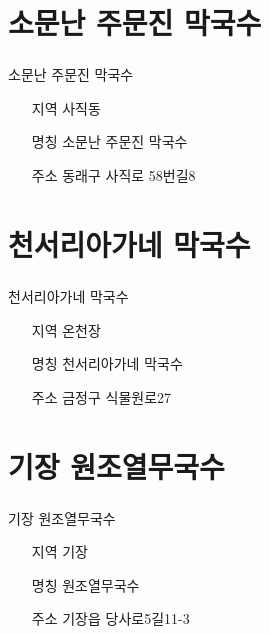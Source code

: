 \documentclass[aspectratio=1610,17pt,xcolor=pdftex,dvipsnames,table,handout]{beamer}
\begin{document}
		\section{ 소문난 주문진 막국수	}
		\begin{frame} [t,plain]
		\frametitle{ }
			\begin{block} {소문난 주문진 막국수	}
			\setlength{\leftmargini}{4em}			
			\begin{itemize}
				\item [지역] 사직동	
				\item [명칭] 소문난 주문진 막국수	
				\item [주소] 동래구 사직로 58번길8
			\end{itemize}
			\end{block}						
		\end{frame}						


		\section{ 천서리아가네 막국수	}
		\begin{frame} [t,plain]
		\frametitle{ }
			\begin{block} {천서리아가네 막국수	}
			\setlength{\leftmargini}{4em}			
			\begin{itemize}
				\item [지역] 온천장	
				\item [명칭] 천서리아가네 막국수	
				\item [주소] 금정구 식물원로27
			\end{itemize}
			\end{block}						
		\end{frame}						


		\section{ 기장 원조열무국수	}
		\begin{frame} [t,plain]
		\frametitle{ }
			\begin{block} {기장 원조열무국수	}
			\setlength{\leftmargini}{4em}			
			\begin{itemize}
				\item [지역] 기장	
				\item [명칭] 원조열무국수	
				\item [주소] 기장읍 당사로5길11-3
			\end{itemize}
			\end{block}						
		\end{frame}						
\end{document}
